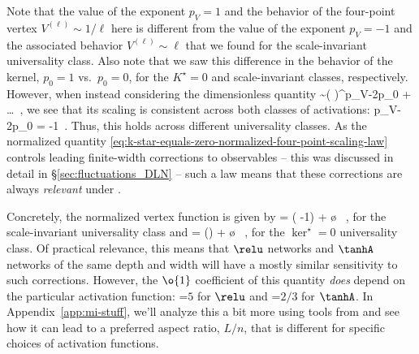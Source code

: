 Note that the value of the exponent $p_V=1$ and the behavior of the four-point vertex $V^{(\ell)}\sim  1/\ell$ here is different from the value of the exponent $p_V=-1$ and the associated behavior $V^{(\ell)}\sim \ell$  that we found for the scale-invariant universality class. Also note that we saw this difference in the behavior of the kernel, $p_0=1$ vs.~$p_0=0$, for the $K^\star=0$ and scale-invariant classes, respectively. However, when instead considering the dimensionless quantity
\be\label{eq:k-star-equals-zero-normalized-four-point-scaling-law}
 \sim  {}\le( \ri)^{p_V-2p_0} + \dots \, ,%
\ee
we see that its scaling is consistent across both classes of activations:
\be\label{eq:vertex-scaling-law}
p_V-2p_0 = -1\, .
\ee
Thus, this  holds across different universality classes. 
As the normalized quantity \eqref{eq:k-star-equals-zero-normalized-four-point-scaling-law} controls leading finite-width corrections to observables  -- this was discussed in detail in 
\S\ref{sec:fluctuations_DLN} --  such a law means that these corrections are always \emph{relevant} under .


Concretely, the normalized vertex function is given by 
\be\label{eq:k-star-equals-zero-normalized-four-point-relu-univ}
 = \le( -1\ri)   + \o{} \, ,
\ee
for the scale-invariant universality class
and 
\be\label{eq:k-star-equals-zero-normalized-four-point-tanh-univ}
 = \le(\ri) + \o{} \, ,
\ee
for the $\ker^{\star}=0$ universality class. 
Of practical relevance, this means that $\relu$ networks and $\tanhA$ networks of the same depth and width will have a mostly similar sensitivity to such corrections. However, the $\o{1}$ coefficient of this quantity \emph{does} depend on the particular activation function: =$5$ for $\relu$ and =$2/3$ for $\tanhA$. In Appendix~\ref{app:mi-stuff}, we'll analyze this a bit more using tools from  and see how it can lead to a preferred aspect ratio, $L/n$, that is different for specific choices of activation functions.





